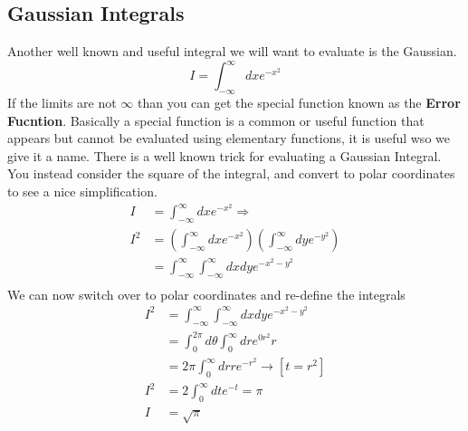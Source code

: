 \documentclass{article}
\newcommand{\be}{\begin{equation}}
\newcommand{\ee}{\end{equation}}
\begin{document}
\subsection*{Gaussian Integrals}
Another well known and useful integral we will want to evaluate is the Gaussian. 
\be
I = \int_{-\infty}^\infty dx e^{-x^2}
\ee
If the limits are not $\infty$ than you can get the special function known as the \textbf{Error Fucntion}. 
Basically a special function is a common or useful function that appears but cannot be evaluated using elementary functions, it is useful wso we give it a name. 
There is a well known trick for evaluating a Gaussian Integral.
You instead consider the square of the integral, and convert to polar coordinates to see a nice simplification.
\be
\begin{split}
	I &= \int_{-\infty}^\infty dx e^{-x^2} \Rightarrow \\
	I^2 &= \left(\int_{-\infty}^\infty dx e^{-x^2}\right) \left(\int_{-\infty}^\infty dy e^{-y^2}\right) \\
	 &= \int_{-\infty}^\infty \int_{-\infty}^\infty dxdy e^{-x^2 - y^2} \\
\end{split}
\ee
We can now switch over to polar coordinates and re-define the integrals
\be
\begin{split}
	 I^2 &= \int_{-\infty}^\infty \int_{-\infty}^\infty dxdy e^{-x^2 - y^2} \\
	 &= \int_0^{2\pi} d\theta \int_0^\infty dr e^{0r^2}r \\
	 &= 2\pi \int_0^\infty dr re^{-r^2} \rightarrow[t=r^2]\\
	 I^2&= 2 \int_0^\infty dt e^{-t} = \pi \\
	 I &= \sqrt{\pi}
\end{split}
\ee
\end{document}

